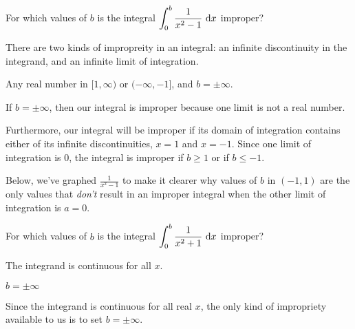 %
%
\subsection*{\Conceptual}
\begin{Mquestion}
For which values of $b$ is the integral
$\displaystyle\int_0^b \frac{1}{x^2-1}~\mathrm{d}x$ improper?
\end{Mquestion}
\begin{hint}
There are two kinds of impropreity in an integral: an infinite discontinuity in the integrand, and an infinite limit of integration.
\end{hint}
\begin{answer}
Any real number in $[1,\infty)$ or $(-\infty,-1]$, and $b = \pm \infty$.
\end{answer}
\begin{solution}
If $ b= \pm \infty$, then our integral is improper because one limit is not a real number.

Furthermore, our integral will be improper if its domain of integration contains either of its infinite discontinuities, $x=1$ and $x=-1$. Since one limit of integration is 0, the integral is improper if $b \geq 1$ or if $b \leq -1$.

Below, we've graphed $\frac{1}{x^2-1}$ to make it clearer why values of $b$ in $(-1,1)$ are the only values that \emph{don't} result in an improper integral when the other limit of integration is $a=0$.

\begin{center}
\end{center}
\end{solution}
\begin{Mquestion}
For which values of $b$ is the integral
$\displaystyle\int_0^b \frac{1}{x^2+1}~\mathrm{d}x$ improper?
\end{Mquestion}
\begin{hint}
The integrand is continuous for all $x$.
\end{hint}
\begin{answer}
$b = \pm\infty$
\end{answer}
\begin{solution}
Since the integrand is continuous for all real $x$, the only kind of impropriety available to us is to set $b = \pm\infty$.
\end{solution}

